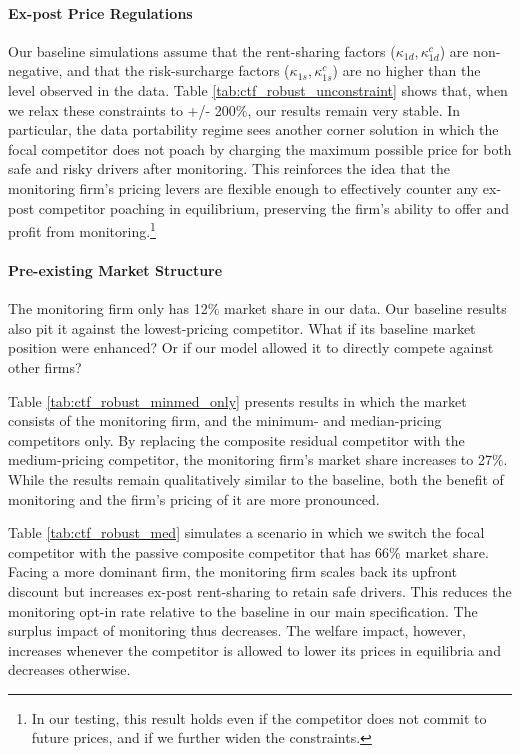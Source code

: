 \paragraph{Ex-post Price Regulations}
Our baseline simulations assume that the rent-sharing factors ($\kappa_{1d}, \kappa^{c}_{1d}$) are non-negative, and that the risk-surcharge factors ($\kappa_{1s}, \kappa^{c}_{1s}$) are no higher than the level observed in the data. Table \ref{tab:ctf_robust_unconstraint} shows that, when we relax these constraints to +/- 200\%, our results remain very stable. In particular, the data portability regime sees another corner solution in which the focal competitor does not poach by charging the maximum possible price for both safe and risky drivers after monitoring. This reinforces the idea that the monitoring firm's pricing levers are flexible enough to effectively counter any ex-post competitor poaching in equilibrium, preserving the firm's ability to offer and profit from monitoring.\footnote{In our testing, this result holds even if the competitor does not commit to future prices, and if we further widen the constraints.}

\paragraph{Pre-existing Market Structure}
The monitoring firm only has 12\% market share in our data. Our baseline results also pit it against the lowest-pricing competitor. What if its baseline market position were enhanced? Or if our model allowed it to directly compete against other firms?

Table \ref{tab:ctf_robust_minmed_only} presents results in which the market consists of the monitoring firm, and the minimum- and median-pricing competitors only. By replacing the composite residual competitor with the medium-pricing competitor, the monitoring firm's market share increases to 27\%. While the results remain qualitatively similar to the baseline, both the benefit of monitoring and the firm's pricing of it are more pronounced.

Table \ref{tab:ctf_robust_med} simulates a scenario in which we switch the focal competitor with the passive composite competitor that has 66\% market share. Facing a more dominant firm, the monitoring firm scales back its upfront discount but increases ex-post rent-sharing to retain safe drivers. This reduces the monitoring opt-in rate relative to the baseline in our main specification. The surplus impact of monitoring thus decreases. The welfare impact, however, increases whenever the competitor is allowed to lower its prices in equilibria and decreases otherwise.
